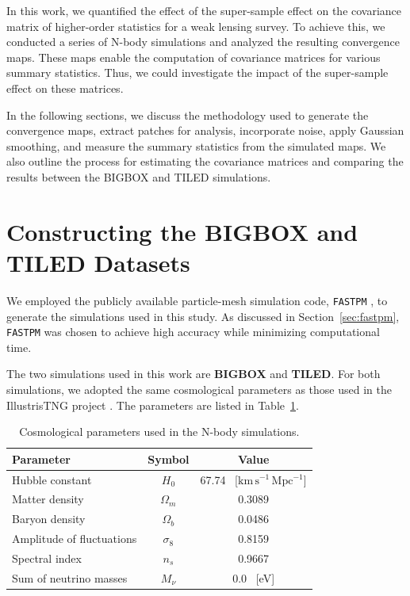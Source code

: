 
In this work, we quantified the effect of the super-sample effect on the covariance matrix of higher-order statistics for a weak lensing survey. To achieve this, we conducted a series of N-body simulations and analyzed the resulting convergence maps. These maps enable the computation of covariance matrices for various summary statistics. Thus, we could investigate the impact of the super-sample effect on these matrices.

In the following sections, we discuss the methodology used to generate the convergence maps, extract patches for analysis, incorporate noise, apply Gaussian smoothing, and measure the summary statistics from the simulated maps. We also outline the process for estimating the covariance matrices and comparing the results between the BIGBOX and TILED simulations.

\section{Constructing the BIGBOX and TILED Datasets}
We employed the publicly available particle-mesh simulation code, \texttt{FASTPM} \citep{10.1093/mnras/stw2123}, to generate the simulations used in this study. As discussed in Section~\ref{sec:fastpm}, \texttt{FASTPM} was chosen to achieve high accuracy while minimizing computational time.

The two simulations used in this work are \textbf{BIGBOX} and \textbf{TILED}. For both simulations, we adopted the same cosmological parameters as those used in the IllustrisTNG project \citep{2019ComAC...6....2N}. The parameters are listed in Table~\ref{tab:simulations}.

\begin{table}[h]
    \centering
    \begin{tabular}{lcc}
    \toprule
    \textbf{Parameter} & \textbf{Symbol} & \textbf{Value} \\
    \midrule
    Hubble constant & $H_0$ & 67.74 \, [$\mathrm{km\,s^{-1}\,Mpc^{-1}}$] \\ 
    Matter density & $\Omega_m$ & 0.3089 \\
    Baryon density & $\Omega_b$ & 0.0486 \\
    Amplitude of fluctuations & $\sigma_8$ & 0.8159 \\
    Spectral index & $n_s$ & 0.9667 \\
    Sum of neutrino masses & $M_{\nu}$ & 0.0 \, [eV] \\
    \bottomrule
    \end{tabular}
    \caption{Cosmological parameters used in the N-body simulations.}\label{tab:simulations}
\end{table}

